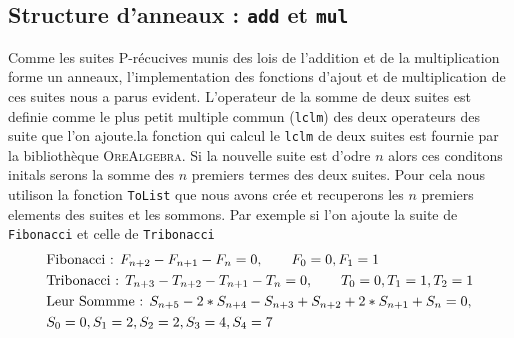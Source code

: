 \documentclass[12pt]{article}
\newlength{\charwidth}
\newcommand{\uline}{\underline{\hspace{2\charwidth}}}
\begin{document}
    \subsection{Structure d'anneaux : \texttt{\uline add\uline } et \texttt{mul}}
        Comme les suites P-récucives munis des lois de l'addition et de la multiplication 
        forme un anneaux, l'implementation des fonctions d'ajout et de multiplication de ces suites
        nous a parus evident. L'operateur de la somme de deux suites est definie comme le plus petit 
        multiple commun (\texttt{lclm}) des deux operateurs des suite que l'on ajoute.la fonction qui
        calcul le \texttt{lclm} de deux suites est fournie par la bibliothèque \textsc{OreAlgebra}. 
        Si la nouvelle suite est d'odre $n$ alors ces conditons initals serons la somme des 
        $n$ premiers termes des deux suites. Pour cela nous utilison la fonction \texttt{ToList} que nous avons crée
        et recuperons les $n$ premiers elements des suites et les sommons.
        Par exemple si l'on ajoute la suite de \texttt{Fibonacci} et celle de \texttt{Tribonacci}
        \begin{align*}
            &\textnormal{Fibonacci : } F_{n+2} - F_{n+1} - F_n = 0,\qquad F_0=0, F_1=1\\
            &\textnormal{Tribonacci : } T_{n+3} - T_{n+2} - T_{n+1} - T_n = 0,\qquad T_0 = 0, T_1 = 1, T_2 = 1\\
            &\textnormal{Leur Sommme : } S_{n+5} - 2*S_{n+4} - S_{n+3} + S_{n+2} + 2*S_{n+1} + S_n = 0,\\&S_0 = 0, S_1 = 2, S_2 = 2, S_3 = 4, S_4 = 7
        \end{align*} 
        
\end{document}
